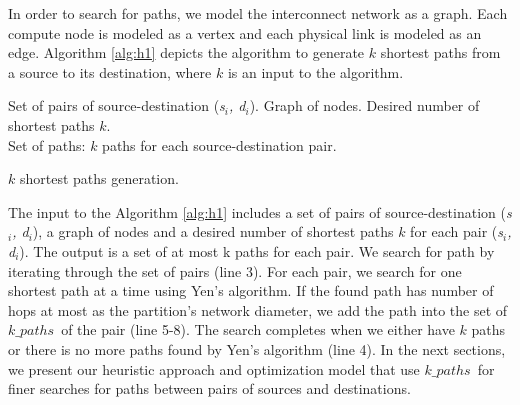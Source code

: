 In order to search for paths, we model the interconnect network as a graph. Each compute node is modeled as a vertex and each physical link is modeled as an edge. Algorithm \ref{alg:h1} depicts the algorithm to generate $k$ shortest paths from a source to its destination, where $k$ is an input to the algorithm.
\begin{algorithm}[!htbp]
 Set of pairs of source-destination (\textit{s$_i$, d$_i$}). Graph of nodes. Desired number of shortest paths $k$.\\
 Set of paths: $k$ paths for each source-destination pair.\\
\caption{$k$ shortest paths generation.}
\label{alg:h1}
\end{algorithm}

The input to the Algorithm \ref{alg:h1} includes a set of pairs of source-destination (\textit{s$_i$, d$_i$}), a graph of nodes and a desired number of shortest paths $k$ for each pair (\textit{s$_i$, d$_i$}). The output is a set of at most k paths for each pair. We search for path by iterating through the set of pairs (line 3). For each pair, we search for one shortest path at a time using Yen's algorithm. If the found path has number of hops at most as the partition's network diameter, we add the path into the set of $k\_paths$\ of the pair (line 5-8). The search completes when we either have $k$ paths or there is no more paths found by Yen's algorithm (line 4). In the next sections, we present our heuristic approach and optimization model that use $k\_paths$\ for finer searches for paths between pairs of sources and destinations.



